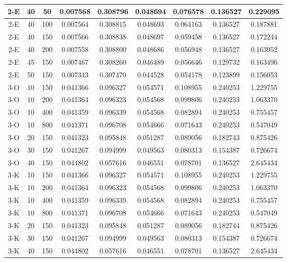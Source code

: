 \begin{center}
\begin{longtable}{|c|c|c|c|c|c|c|c|c|}
	\hline 2-E &	40 &	50	&	0.007568 &	0.308796 &	0.048694 &	0.076578 &	0.136527 &	0.229095 \\
	\hline 2-E &	40 &	100	&	0.007564 &	0.308815 &	0.048693 &	0.064163 &	0.136527 &	0.187881 \\
	\hline 2-E &	40 &	150	&	0.007566 &	0.308838 &	0.048697 &	0.059458 &	0.136527 &	0.172244 \\
	\hline 2-E &	40 &	200	&	0.007558 &	0.308800 &	0.048686 &	0.056948 &	0.136527 &	0.163952 \\
	\hline 2-E &	45 &	150	&	0.007467 &	0.308260 &	0.046489 &	0.056646 &	0.129732 &	0.163496 \\
	\hline 2-E &	50 &	150	&	0.007343 &	0.307470 &	0.044528 &	0.054178 &	0.123899 &	0.156053 \\
	\hline 3-O &	10 &	150	&	0.041366 &	0.096327 &	0.054571 &	0.108955 &	0.240253 &	1.229755 \\
	\hline 3-O &	10 &	200	&	0.041364 &	0.096323 &	0.054568 &	0.099806 &	0.240253 &	1.063370 \\
	\hline 3-O &	10 &	400	&	0.041359 &	0.096339 &	0.054568 &	0.082894 &	0.240253 &	0.755457 \\
	\hline \rowcolor{bad} 3-O &	10 &	800	&	0.041371 &	0.096708 &	0.054666 &	0.071643 &	0.240253 &	0.547049 \\
	\hline 3-O &	20 &	150	&	0.041323 &	0.095848 &	0.051287 &	0.089056 &	0.182743 &	0.875426 \\
	\hline 3-O &	30 &	150	&	0.041267 &	0.094999 &	0.049563 &	0.080313 &	0.154387 &	0.726674 \\
	\hline \rowcolor{bad} 3-O &	40 &	150	&	0.044802 &	0.057616 &	0.046551 &	0.078701 &	0.136527 &	2.645434 \\
	\hline 3-K &	10 &	150	&	0.041366 &	0.096327 &	0.054571 &	0.108955 &	0.240253 &	1.229755 \\
	\hline 3-K &	10 &	200	&	0.041364 &	0.096323 &	0.054568 &	0.099806 &	0.240253 &	1.063370 \\
	\hline 3-K &	10 &	400	&	0.041359 &	0.096339 &	0.054568 &	0.082894 &	0.240253 &	0.755457 \\
	\hline \rowcolor{bad} 3-K &	10 &	800	&	0.041371 &	0.096708 &	0.054666 &	0.071643 &	0.240253 &	0.547049 \\
	\hline 3-K &	20 &	150	&	0.041323 &	0.095848 &	0.051287 &	0.089056 &	0.182744 &	0.875426 \\
	\hline 3-K &	30 &	150	&	0.041267 &	0.094999 &	0.049563 &	0.080313 &	0.154387 &	0.726674 \\
	\hline \rowcolor{bad} 3-K &	40 &	150	&	0.044802 &	0.057616 &	0.046551 &	0.078701 &	0.136527 &	2.645434 \\

\end{longtable}
\end{center}
